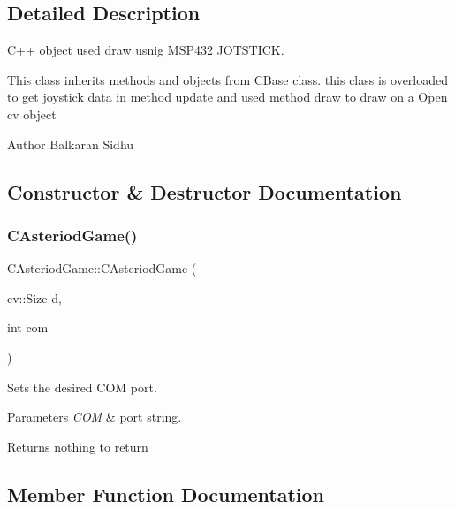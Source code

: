 \subsection{Detailed Description}
C++ object used draw usnig M\+S\+P432 J\+O\+T\+S\+T\+I\+CK. 

This class inherits methods and objects from C\+Base class. this class is overloaded to get joystick data in method update and used method draw to draw on a Open cv object

\begin{DoxyAuthor}{Author}
Balkaran Sidhu 
\end{DoxyAuthor}


\subsection{Constructor \& Destructor Documentation}
\hypertarget{class_c_asteriod_game_afdff290987d441921d6549e8f6756b5d}{}\label{class_c_asteriod_game_afdff290987d441921d6549e8f6756b5d} 
\subsubsection{\texorpdfstring{C\+Asteriod\+Game()}{CAsteriodGame()}}
{\footnotesize\ttfamily C\+Asteriod\+Game\+::\+C\+Asteriod\+Game (\begin{DoxyParamCaption}\item[{cv\+::\+Size}]{d,  }\item[{int}]{com }\end{DoxyParamCaption})}



Sets the desired C\+OM port. 


\begin{DoxyParams}{Parameters}
{\em C\+OM} & port string. \\
\hline
\end{DoxyParams}
\begin{DoxyReturn}{Returns}
nothing to return 
\end{DoxyReturn}


\subsection{Member Function Documentation}
\hypertarget{class_c_asteriod_game_a787c6be5d95bc54c4c51b33f7da41b0a}{}\label{class_c_asteriod_game_a787c6be5d95bc54c4c51b33f7da41b0a} 
